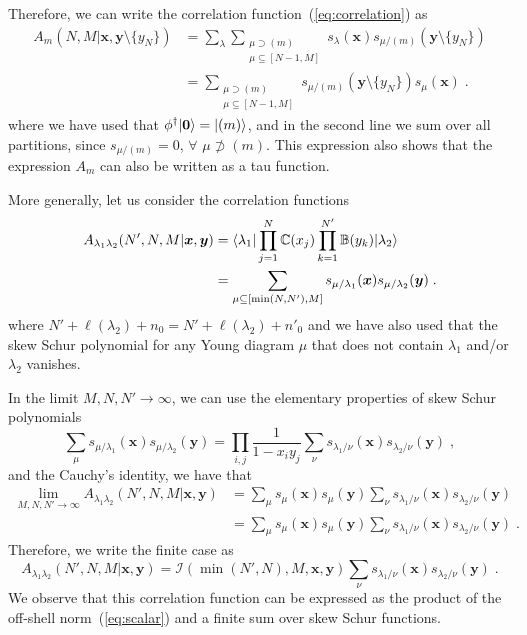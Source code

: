 \documentclass[a4paper,11pt]{amsart}
\begin{document}
Therefore, we can write the correlation function~(\ref{eq:correlation}) as 
\begin{equation}
\begin{split}
  A_m(N, M|\bm{x}, \bm{y}\setminus \{y_N\})
  & = \sum_\lambda \sum_{\substack{\mu \supset (m)\\ \mu \subseteq [N-1, M]}}
  s_{\lambda}(\bm{x}) s_{\mu/(m)}(\bm{y}\setminus\{y_N\})\\
  & = \sum_{\substack{\mu \supset (m)\\ \mu \subseteq [N-1, M]}}
  s_{\mu/(m)}(\bm{y}\setminus\{y_N\}) s_{\mu}(\bm{x})\; .
\end{split}
\end{equation}
where we have used that \(\phi^\dagger \lvert\bm{0}\rangle = \lvert(m)\rangle\), and in the second line
we sum over all partitions, since \(s_{\mu/(m)} = 0\), \(\forall \) \(\mu \not \supset (m)\).
This expression also shows that the expression \(A_m\) can also be written as a tau function. 

More generally, let us consider the correlation functions 
\begin{equation}
\begin{split}
  A_{\lambda_1 \lambda_2}(N', N, M|\bm{x}, \bm{y}) & =
  \langle\lambda_1\rvert \prod_{j=1}^N \mathbb{C}(x_j)
  \prod_{k=1}^{N'} \mathbb{B}(y_k)\lvert\lambda_2\rangle \\
  & = \sum_{\mu \subseteq [\min(N, N'), M]} s_{\mu/\lambda_1}(\bm{x}) s_{\mu/\lambda_2}(\bm{y}) \; .
\end{split}
\end{equation}
where \(N' + \ell(\lambda_2) + n_0 = N' + \ell(\lambda_2) + n'_0\) and
we have also used that the skew Schur polynomial for any Young diagram
\(\mu\) that does not contain \(\lambda_1\) and/or \(\lambda_2\)
vanishes.

In the limit \(M, N, N' \to \infty\), we can use the elementary
properties of skew Schur polynomials~\cite{Macdonald:1998}
\begin{equation}
  \sum_{\mu} s_{\mu/\lambda_1}(\bm{x}) s_{\mu/\lambda_2}(\bm{y}) = \prod_{i,j}\frac{1}{1 - x_i y_j}
 \sum_\nu s_{\lambda_1/\nu}(\bm{x}) s_{\lambda_2/\nu}(\bm{y})\; ,
\end{equation}
and the Cauchy's identity, we have that  
\begin{equation}
\begin{split}
  \lim_{M, N, N'\to \infty} A_{\lambda_1 \lambda_2}(N', N, M|\bm{x}, \bm{y})
  & = \sum_\mu s_{\mu}(\bm{x}) s_{\mu}(\bm{y})
 \sum_\nu s_{\lambda_1/\nu}(\bm{x}) s_{\lambda_2/\nu}(\bm{y})\\ 
  & = \sum_\mu s_{\mu}(\bm{x}) s_{\mu}(\bm{y})
 \sum_\nu s_{\lambda_1/\nu}(\bm{x}) s_{\lambda_2/\nu}(\bm{y})\; .
\end{split}
\end{equation}
Therefore, we write the finite case as
\begin{equation}
  A_{\lambda_1 \lambda_2}(N', N, M|\bm{x}, \bm{y})
  = \mathcal{I}(\min(N',N),M, \bm{x}, \bm{y})
  \sum_\nu s_{\lambda_1/\nu}(\bm{x}) s_{\lambda_2/\nu}(\bm{y})\; .
\end{equation}
We observe that this correlation function can be expressed as the
product of the off-shell norm~(\ref{eq:scalar}) and a finite sum over
skew Schur functions.
\end{document}
